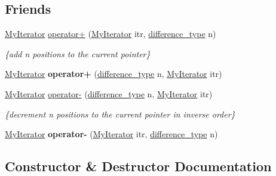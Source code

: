 \subsection*{Friends}
\begin{DoxyCompactItemize}
\item 
\hyperlink{classMyIterator}{My\+Iterator} \hyperlink{classMyIterator_a00e9adb1f8c6f6c331689846c83ef9c0}{operator+} (\hyperlink{classMyIterator}{My\+Iterator} itr, \hyperlink{classMyIterator_ad6844a285132dae3746eab56209a19df}{difference\+\_\+type} n)
\begin{DoxyCompactList}\small\item\em \{add n positions to the current pointer\} \end{DoxyCompactList}\item 
\mbox{\label{classMyIterator_aec9f85d17a37da42b8850a3628ddf7f0}} 
\hyperlink{classMyIterator}{My\+Iterator} {\bfseries operator+} (\hyperlink{classMyIterator_ad6844a285132dae3746eab56209a19df}{difference\+\_\+type} n, \hyperlink{classMyIterator}{My\+Iterator} itr)
\item 
\hyperlink{classMyIterator}{My\+Iterator} \hyperlink{classMyIterator_a5814a5d203e8f75aea64183bcb025db4}{operator-\/} (\hyperlink{classMyIterator_ad6844a285132dae3746eab56209a19df}{difference\+\_\+type} n, \hyperlink{classMyIterator}{My\+Iterator} itr)
\begin{DoxyCompactList}\small\item\em \{decrement n positions to the current pointer in inverse order\} \end{DoxyCompactList}\item 
\mbox{\label{classMyIterator_ab158f45402b9b5ea691473afeabf4ff4}} 
\hyperlink{classMyIterator}{My\+Iterator} {\bfseries operator-\/} (\hyperlink{classMyIterator}{My\+Iterator} itr, \hyperlink{classMyIterator_ad6844a285132dae3746eab56209a19df}{difference\+\_\+type} n)
\end{DoxyCompactItemize}


\subsection{Constructor \& Destructor Documentation}
\mbox{\label{classMyIterator_a7c73c294e14c9f104970350ce48707fd}} 
